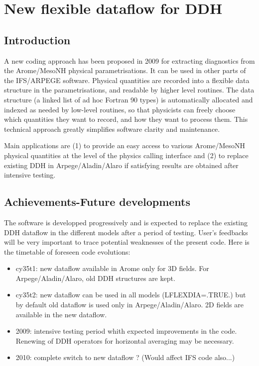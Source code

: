 \section{New flexible dataflow for DDH}
\label{sec_new_dataflow}

\subsection{Introduction}
A new coding approach has been proposed in 2009 for extracting diagnostics
from the Arome/MesoNH physical parametrisations. It can be used in other parts of
the IFS/ARPEGE software. Physical quantities are recorded into a flexible data structure in the parametrisations, and readable by
higher level routines. The data structure (a linked list of ad hoc Fortran 90 types) is automatically 
allocated and indexed as needed by low-level routines, so that physicists can freely choose 
which quantities they want to record, and how they want to process them. This technical approach 
greatly simplifies software clarity and maintenance. 

Main applications are (1) to provide an
easy access to various Arome/MesoNH physical quantities at the level of the physics calling 
interface and (2) to replace existing DDH in Arpege/Aladin/Alaro if satisfying results are
obtained after intensive testing.


\subsection{Achievements-Future developments}
The software is developped progressively and is expected to replace the existing DDH dataflow 
in the different models after a period of testing. User's feedbacks will be very important to 
trace potential weaknesses of the present code.
Here is the timetable of foreseen code evolutions:
\begin{itemize}
\item cy35t1: new dataflow available in Arome only for 3D fields. For Arpege/Aladin/Alaro, old DDH structures are kept.
\item cy35t2: new dataflow can be used in all models (LFLEXDIA=.TRUE.) but by default old dataflow is used only in Arpege/Aladin/Alaro.
2D fields are available in the new dataflow. 
\item 2009: intensive testing period whith expected improvements in the code. Renewing of DDH operators for horizontal averaging may be necessary.
\item 2010: complete switch to new dataflow ? (Would affect IFS code also...)
\end{itemize}



